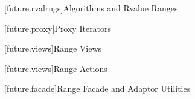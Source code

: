 
[future.rvalrngs]{Algorithms and Rvalue Ranges}

\pnum


[future.proxy]{Proxy Iterators}

\pnum


[future.views]{Range Views}

\pnum


[future.views]{Range Actions}

\pnum


[future.facade]{Range Facade and Adaptor Utilities}

\pnum

